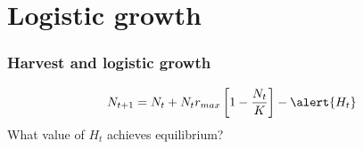 \documentclass[color=usenames,dvipsnames]{beamer}\usepackage[]{graphicx}\usepackage[]{color}
\begin{document}
\section{Logistic growth}







\begin{frame}
  \frametitle{Harvest and logistic growth}
  \LARGE
  \[
    N_{t+1} = N_t + N_t r_{max}\left[1 - \frac{N_t}{K} \right] - \alert{H_t}
  \]
  \pause
  \vfill
  \Large
  \centering %
  What value of $H_t$ achieves equilibrium? \\
\end{frame}
\end{document}
